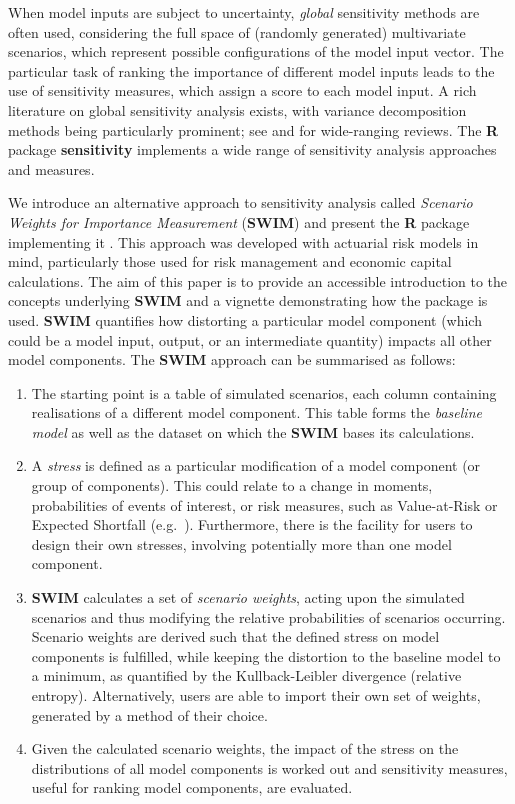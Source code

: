 \documentclass[
]{article}
\begin{document}
When model inputs are subject to uncertainty, \emph{global} sensitivity methods are often used, considering the full space of (randomly generated) multivariate scenarios, which represent possible configurations of the model input vector. The particular task of ranking the importance of different model inputs leads to the use of sensitivity measures, which assign a score to each model input. A rich literature on global sensitivity analysis exists, with variance decomposition methods being particularly prominent; see \citet{Saltelli2008} and \citet{Borgonovo2016} for wide-ranging reviews. The \textbf{R} package \textbf{sensitivity} \citep{Rsensitivity} implements a wide range of sensitivity analysis approaches and measures.

We introduce an alternative approach to sensitivity analysis called \emph{Scenario Weights for Importance Measurement} (\textbf{SWIM}) and present the \textbf{R} package implementing it \citep{PesentiR}. This approach was developed with actuarial risk models in mind, particularly those used for risk management and economic capital calculations. The aim of this paper is to provide an accessible introduction to the concepts underlying \textbf{SWIM} and a vignette demonstrating how the package is used. \textbf{SWIM} quantifies how distorting a particular model component (which could be a model input, output, or an intermediate quantity) impacts all other model components. The \textbf{SWIM} approach can be summarised as follows:

\begin{enumerate}
\def\labelenumi{\arabic{enumi}.}
\item
  The starting point is a table of simulated scenarios, each column containing realisations of a different model component. This table forms the \emph{baseline model} as well as the dataset on which the \textbf{SWIM} bases its calculations.
\item
  A \emph{stress} is defined as a particular modification of a model component (or group of components). This could relate to a change in moments, probabilities of events of interest, or risk measures, such as Value-at-Risk or Expected Shortfall (e.g.~\citet{Mcneil2015B}). Furthermore, there is the facility for users to design their own stresses, involving potentially more than one model component.
\item
  \textbf{SWIM} calculates a set of \emph{scenario weights}, acting upon the simulated scenarios and thus modifying the relative probabilities of scenarios occurring. Scenario weights are derived such that the defined stress on model components is fulfilled, while keeping the distortion to the baseline model to a minimum, as quantified by the Kullback-Leibler divergence (relative entropy). Alternatively, users are able to import their own set of weights, generated by a method of their choice.
\item
  Given the calculated scenario weights, the impact of the stress on the distributions of all model components is worked out and sensitivity measures, useful for ranking model components, are evaluated.
\end{enumerate}
\end{document}

